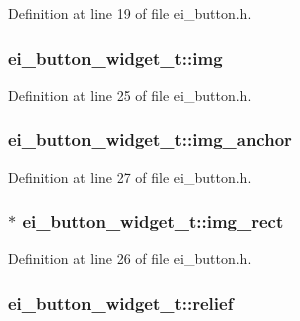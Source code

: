 Definition at line 19 of file ei\_\-button.h.\hypertarget{structei__button__widget__t_af4b80571568794c12bd89b0c241b6f59}{
\subsubsection[{img}]{ {\bf ei\_\-button\_\-widget\_\-t::img}}}
\label{structei__button__widget__t_af4b80571568794c12bd89b0c241b6f59}


Definition at line 25 of file ei\_\-button.h.\hypertarget{structei__button__widget__t_ad0d7ec24f441b9bec4956f68bd9e2cfe}{
\subsubsection[{img\_\-anchor}]{ {\bf ei\_\-button\_\-widget\_\-t::img\_\-anchor}}}
\label{structei__button__widget__t_ad0d7ec24f441b9bec4956f68bd9e2cfe}


Definition at line 27 of file ei\_\-button.h.\hypertarget{structei__button__widget__t_abee8acda30d36052da02e65b28321389}{
\subsubsection[{img\_\-rect}]{$\ast$ {\bf ei\_\-button\_\-widget\_\-t::img\_\-rect}}}
\label{structei__button__widget__t_abee8acda30d36052da02e65b28321389}


Definition at line 26 of file ei\_\-button.h.\hypertarget{structei__button__widget__t_a347faf83fbd41810b382eba99c7e9e38}{
\subsubsection[{relief}]{ {\bf ei\_\-button\_\-widget\_\-t::relief}}}
\label{structei__button__widget__t_a347faf83fbd41810b382eba99c7e9e38}


